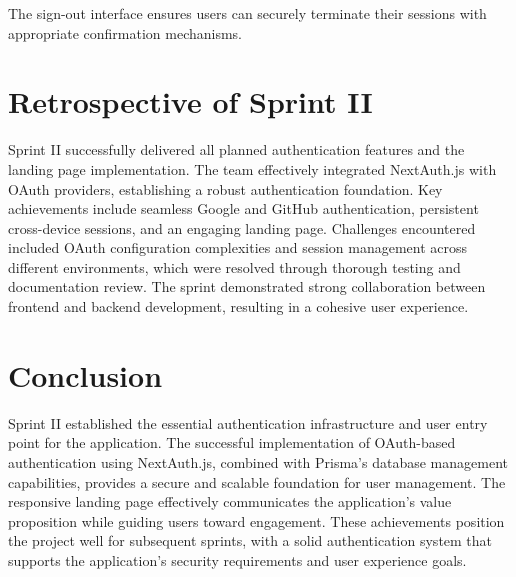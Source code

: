 The sign-out interface ensures users can securely terminate their sessions with appropriate confirmation mechanisms.

\section{Retrospective of Sprint II}

Sprint II successfully delivered all planned authentication features and the landing page implementation. The team effectively integrated NextAuth.js with OAuth providers, establishing a robust authentication foundation. Key achievements include seamless Google and GitHub authentication, persistent cross-device sessions, and an engaging landing page. Challenges encountered included OAuth configuration complexities and session management across different environments, which were resolved through thorough testing and documentation review. The sprint demonstrated strong collaboration between frontend and backend development, resulting in a cohesive user experience.

\section{Conclusion}

Sprint II established the essential authentication infrastructure and user entry point for the application. The successful implementation of OAuth-based authentication using NextAuth.js, combined with Prisma's database management capabilities, provides a secure and scalable foundation for user management. The responsive landing page effectively communicates the application's value proposition while guiding users toward engagement. These achievements position the project well for subsequent sprints, with a solid authentication system that supports the application's security requirements and user experience goals.